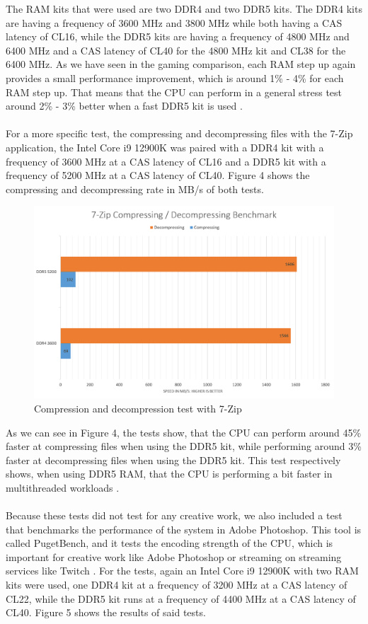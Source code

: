 The RAM kits that were used are two DDR4 and two DDR5 kits. The DDR4 kits are having a frequency of 3600 MHz and 3800 MHz while both having a CAS latency of CL16, while the DDR5 kits are having a frequency of 4800 MHz and 6400 MHz and a CAS latency of CL40 for the 4800 MHz kit and CL38 for the 6400 MHz. As we have seen in the gaming comparison, each RAM step up again provides a small performance improvement, which is around 1\% - 4\% for each RAM step up. That means that the CPU can perform in a general stress test around 2\% - 3\% better when a fast DDR5 kit is used \parencite{youtube_test_3dmark}.
\\
\\
For a more specific test, the compressing and decompressing files with the 7-Zip application, the Intel Core i9 12900K was paired with a DDR4 kit with a frequency of 3600 MHz at a CAS latency of CL16 and a DDR5 kit with a frequency of 5200 MHz at a CAS latency of CL40. Figure 4 shows the compressing and decompressing rate in \gls{MB/s} of both tests.

\begin{figure}[H]
    \centering
    \includegraphics[width=13cm]{figures/Diagram 7-Zip.png}
    \caption{Compression and decompression test with 7-Zip \parencite{test_7zip}}
\end{figure}

As we can see in Figure 4, the tests show, that the CPU can perform around 45\% faster at compressing files when using the DDR5 kit, while performing around 3\% faster at decompressing files when using the DDR5 kit. This test respectively shows, when using DDR5 RAM, that the CPU is performing a bit faster in multithreaded workloads \parencite{test_7zip}.
\\
\\
Because these tests did not test for any creative work, we also included a test that benchmarks the performance of the system in Adobe Photoshop. This tool is called PugetBench, and it tests the encoding strength of the CPU, which is important for creative work like Adobe Photoshop or streaming on streaming services like Twitch \parencite{what_is_pugetbench}. For the tests, again an Intel Core i9 12900K with two RAM kits were used, one DDR4 kit at a frequency of 3200 MHz at a CAS latency of CL22, while the DDR5 kit runs at a frequency of 4400 MHz at a CAS latency of CL40. Figure 5 shows the results of said tests.

